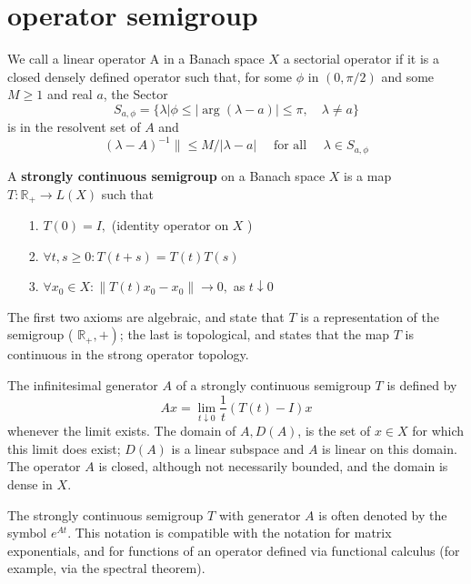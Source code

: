 \section{operator semigroup}

\begin{definition}
	
 We call a linear operator A in a Banach space $X$ a sectorial operator if it is a closed densely defined operator such that, for some $\phi $ in $(0, \pi / 2)$ and some $M \geq 1$ and real $a$, the
	Sector
	$$
	S_{a, \phi}=\{\lambda|\phi \leq| \arg (\lambda-a) \mid \leq \pi, \quad \lambda \neq a\}
	$$
	is in the resolvent set of $A$ and
	$$
	(\lambda-A)^{-1} \| \leq M /|\lambda-a| \quad \text { for all } \quad \lambda \in S_{a, \phi}
	$$
\end{definition}
\begin{definition}
	
	A \textbf{strongly continuous semigroup} on a Banach space $X$ is a map $T: \mathbb{R}_{+} \rightarrow L(X)$ such that
	\begin{itemize}
		\item [1.] $T(0)=I,$ (identity operator on $X$ )
		\item [2.] $\forall t, s \geq 0: T(t+s)=T(t) T(s)$
		\item [3.] $\forall x_{0} \in X:\left\|T(t) x_{0}-x_{0}\right\| \rightarrow 0,$ as $t \downarrow 0$
	\end{itemize}
	The first two axioms are algebraic, and state that $T$ is a representation of the semigroup ( $\left.\mathbb{R}_{+},+\right)$; the last is topological, and states that the map $T$ is continuous in the strong operator topology.

\end{definition}

The infinitesimal generator $A$ of a strongly continuous semigroup $T$ is defined by
$$
A x=\lim _{t \downarrow 0} \frac{1}{t}(T(t)-I) x
$$
whenever the limit exists. The domain of $A, D(A)$, is the set of $x \in X$ for which this limit does exist; $D(A)$ is a linear subspace and $A$ is linear on this domain.  The operator $A$ is closed, although not necessarily bounded, and the domain is dense in $X.$

The strongly continuous semigroup $T$ with generator $A$ is often denoted by the symbol $e^{A t}$. This notation is compatible with the notation for matrix exponentials, and for functions of an operator defined via functional calculus (for example, via the spectral theorem).




